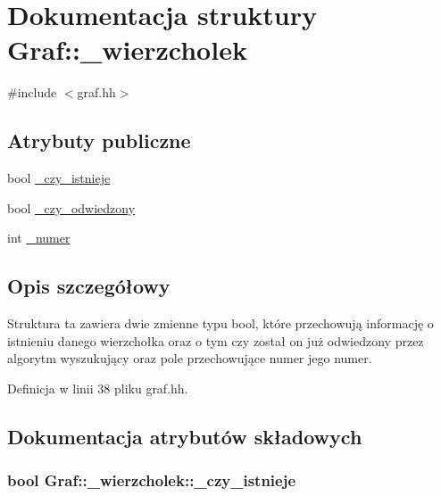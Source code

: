 \hypertarget{struct_graf_1_1__wierzcholek}{\section{\-Dokumentacja struktury \-Graf\-:\-:\-\_\-wierzcholek}
\label{struct_graf_1_1__wierzcholek}
}


{\ttfamily \#include $<$graf.\-hh$>$}

\subsection*{\-Atrybuty publiczne}
\begin{DoxyCompactItemize}
\item 
bool \hyperlink{struct_graf_1_1__wierzcholek_a157d209583d1813f1a609cfb08682ffe}{\-\_\-czy\-\_\-istnieje}
\item 
bool \hyperlink{struct_graf_1_1__wierzcholek_a818c370b6e8a476f6fb9f89ccac01e2f}{\-\_\-czy\-\_\-odwiedzony}
\item 
int \hyperlink{struct_graf_1_1__wierzcholek_a966ecd51ba3e337c8b67587cffab7f9a}{\-\_\-numer}
\end{DoxyCompactItemize}


\subsection{\-Opis szczegółowy}
\-Struktura ta zawiera dwie zmienne typu bool, które przechowują informację o istnieniu danego wierzchołka oraz o tym czy został on już odwiedzony przez algorytm wyszukujący oraz pole przechowujące numer jego numer. 

\-Definicja w linii 38 pliku graf.\-hh.



\subsection{\-Dokumentacja atrybutów składowych}
\hypertarget{struct_graf_1_1__wierzcholek_a157d209583d1813f1a609cfb08682ffe}{
\subsubsection[{\-\_\-czy\-\_\-istnieje}]{\setlength{\rightskip}{0pt plus 5cm}bool {\bf \-Graf\-::\-\_\-wierzcholek\-::\-\_\-czy\-\_\-istnieje}}}\label{struct_graf_1_1__wierzcholek_a157d209583d1813f1a609cfb08682ffe}


